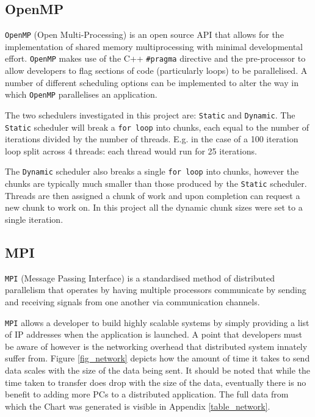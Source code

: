 \documentclass[journal,transmag]{IEEEtran}
\begin{document}
	\subsection{OpenMP}
		\texttt{OpenMP} (Open Multi-Processing) is an open source API that allows for the implementation of shared memory multiprocessing with minimal developmental effort. \texttt{OpenMP} makes use of the C++ \texttt{\#pragma} directive and the pre-processor to allow developers to flag sections of code (particularly loops) to be parallelised. A number of different scheduling options can be implemented to alter the way in which \texttt{OpenMP} parallelises an application.
		
		The two schedulers investigated in this project are: \texttt{Static} and \texttt{Dynamic}. The \texttt{Static} scheduler will break a \texttt{for loop} into chunks, each equal to the number of iterations divided by the number of threads. E.g. in the case of a 100 iteration loop split across 4 threads: each thread would run for 25 iterations.
		
		The \texttt{Dynamic} scheduler also breaks a single \texttt{for loop} into chunks, however the chunks are typically much smaller than those produced by the \texttt{Static} scheduler. Threads are then assigned a chunk of work and upon completion can request a new chunk to work on. In this project all the dynamic chunk sizes were set to a single iteration.	

	\subsection{MPI}
		\texttt{MPI} (Message Passing Interface) is a standardised method of distributed parallelism that operates by having multiple processors communicate by sending and receiving signals from one another via communication channels. 
		
		\texttt{MPI} allows a developer to build highly scalable systems by simply providing a list of IP addresses when the application is launched. A point that developers must be aware of however is the networking overhead that distributed system innately suffer from. Figure \ref{fig_network} depicts how  the amount of time it takes to send data scales with the size of the data being sent. It should be noted that while the time taken to transfer does drop with the size of the data, eventually there is no benefit to adding more PCs to a distributed application. The full data from which the Chart was generated is visible in Appendix \ref{table_network}.
\end{document}
